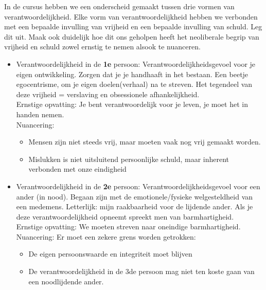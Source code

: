 \documentclass[main.tex]{subfiles}
\begin{document}
\begin{examenvraag}
    \begin{vraag}
        In de cursus hebben we een onderscheid gemaakt tussen drie vormen van verantwoordelijkheid. Elke vorm van verantwoordelijkheid hebben we verbonden met een bepaalde invulling van vrijheid en een bepaalde invulling van schuld. Leg dit uit. Maak ook duidelijk hoe dit ons geholpen heeft het neoliberale begrip van vrijheid en schuld zowel ernstig te nemen alsook te nuanceren.
    \end{vraag}

    \begin{antwoord}
    \begin{itemize}
    		\item Verantwoordelijkheid in de \textbf{1e} persoon: Verantwoordelijkheidsgevoel voor je eigen ontwikkeling. Zorgen dat je je handhaaft in het bestaan. Een beetje egocentrisme, om je eigen doelen(verhaal) na te streven. Het tegendeel van deze vrijheid = verslaving en obsessionele afhankelijkheid.\\
    		Ernstige opvatting: Je bent verantwoordelijk voor je leven, je moet het in handen nemen.\\
    		Nuancering: 
    		\begin{itemize}
    			\item Mensen zijn niet steeds vrij, maar moeten vaak nog vrij gemaakt worden.
    			\item Mislukken is niet uitsluitend persoonlijke schuld, maar inherent verbonden met onze eindigheid
    			
    		\end{itemize}
    		 
    		
    		\item Verantwoordelijkheid in de \textbf{2e} persoon: Verantwoordelijkheidsgevoel voor een ander (in nood). Begaan zijn met de emotionele/fysieke welgesteldheid
    		van een medemens. Letterlijk: mijn raakbaarheid voor de lijdende ander. Als je deze verantwoordelijkheid
    		opneemt spreekt men van barmhartigheid.\\
    		Ernstige opvatting: We moeten streven naar oneindige barmhartigheid.\\
    		Nuancering: Er moet een zekere grens worden getrokken:
    		\begin{itemize}
    			\item De eigen persoonswaarde en integriteit moet blijven
    			\item De verantwoordelijkheid in de 3de persoon mag niet ten koste gaan van een noodlijdende ander.
    		\end{itemize}
    		

\end{itemize}
\end{antwoord}
\end{examenvraag}
\end{document}

